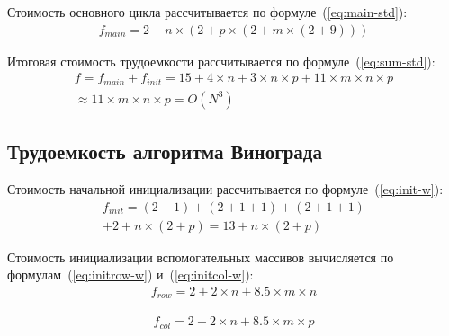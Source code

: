 Стоимость основного цикла рассчитывается по формуле~(\ref{eq:main-std}):
\begin{equation}
    \label{eq:main-std}
    \begin{gathered}
        f_{main} = 2 + n \times (2 + p \times (2 + m \times (2 + 9)))
    \end{gathered} 
\end{equation}

Итоговая стоимость трудоемкости рассчитывается по формуле~(\ref{eq:sum-std}):
\begin{equation}
    \label{eq:sum-std}
    \begin{gathered}
        f = f_{main} + f_{init} = 15 + 4 \times n + 3 \times n \times p + 11 \times m \times n \times p  \\ 
        \approx 11 \times m \times n \times p = O(N^3)
    \end{gathered} 
\end{equation}

\subsection{Трудоемкость алгоритма Винограда}

Стоимость начальной инициализации рассчитывается по формуле~(\ref{eq:init-w}):
\begin{equation}
    \label{eq:init-w}
    \begin{gathered}
        f_{init} = (2 + 1) + (2 + 1 + 1) + (2 + 1 + 1) \\
        + 2 + n \times (2 + p) = 13 + n \times (2 + p)
    \end{gathered} 
\end{equation}

Стоимость инициализации вспомогательных массивов вычисляется по формулам~(\ref{eq:initrow-w}) и~(\ref{eq:initcol-w}):
\begin{equation}
    \label{eq:initrow-w}
    \begin{gathered}
        f_{row} = 2 + 2 \times n + 8.5 \times m \times n
    \end{gathered} 
\end{equation}

\begin{equation}
    \label{eq:initcol-w}
    \begin{gathered}
        f_{col} = 2 + 2 \times n + 8.5 \times m \times p
    \end{gathered} 
\end{equation}

